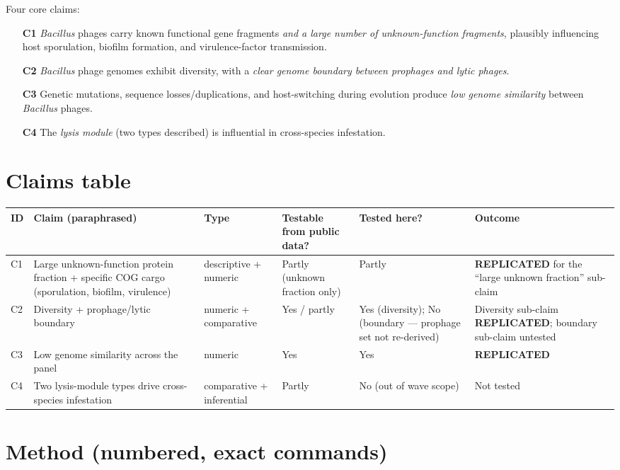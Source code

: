 \documentclass[11pt]{article}
\begin{document}
Four core claims:
\begin{enumerate}
    \item[\textbf{C1}] \emph{Bacillus} phages carry known functional gene fragments \emph{and a large number of unknown-function fragments}, plausibly influencing host sporulation, biofilm formation, and virulence-factor transmission.
    \item[\textbf{C2}] \emph{Bacillus} phage genomes exhibit diversity, with a \emph{clear genome boundary between prophages and lytic phages}.
    \item[\textbf{C3}] Genetic mutations, sequence losses/duplications, and host-switching during evolution produce \emph{low genome similarity} between \emph{Bacillus} phages.
    \item[\textbf{C4}] The \emph{lysis module} (two types described) is influential in cross-species infestation.
\end{enumerate}

\section{Claims table}

\begin{longtable}{@{}p{0.5cm}p{5.2cm}p{2.0cm}p{2.5cm}p{2.5cm}p{1.9cm}@{}}
\toprule
ID & Claim (paraphrased) & Type & Testable from public data? & Tested here? & Outcome \\
\midrule
C1 & Large unknown-function protein fraction + specific COG cargo (sporulation, biofilm, virulence) & descriptive + numeric & Partly (unknown fraction only) & Partly & \textbf{REPLICATED} for the ``large unknown fraction'' sub-claim \\
C2 & Diversity + prophage/lytic boundary & numeric + comparative & Yes / partly & Yes (diversity); No (boundary --- prophage set not re-derived) & Diversity sub-claim \textbf{REPLICATED}; boundary sub-claim untested \\
C3 & Low genome similarity across the panel & numeric & Yes & Yes & \textbf{REPLICATED} \\
C4 & Two lysis-module types drive cross-species infestation & comparative + inferential & Partly & No (out of wave scope) & Not tested \\
\bottomrule
\end{longtable}

\section{Method (numbered, exact commands)}
\end{document}
